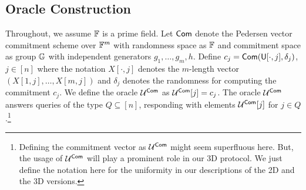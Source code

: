 \subsection{Oracle Construction}\label{subsec: commit2D}
Throughout, we assume $\mathbb{F}$ is a prime field. Let $\mathsf{Com}$ denote the Pedersen vector commitment scheme over $\mathbb{F}^m$ with randomness space as $\mathbb{F}$ and commitment space as group $\mathbb{G}$ with independent generators $g_1,\ldots,g_m, h$. Define $c_{j} = \mathsf{Com}(\mathsf{U}[\cdot,j],\delta_{j})$, $j\in [n]$ where the notation $X[\cdot,j]$ denotes the $m$-length vector $(X[1,j],\ldots,X[m,j])$ and $\delta_{j}$ denotes the randomness for computing the commitment $c_{j}$. We define the oracle $\mathcal{U}^{\mathsf{Com}}$ as $\mathcal{U}^{\mathsf{Com}}[j]=c_{j}$. The oracle $\mathcal{U}^{\mathsf{Com}}$ answers queries of the type $Q\subseteq [n]$, responding with elements $\mathcal{U}^{\mathsf{Com}}[j]$ for $j\in Q$.\footnote{Defining the commitment vector as $\mathcal{U}^{\mathsf{Com}}$ might seem superfluous here. But, the usage of $\mathcal{U}^{\mathsf{Com}}$ will play a prominent role in our 3D protocol. We just define the notation here for the uniformity in our descriptions of the 2D and the 3D versions.} 



